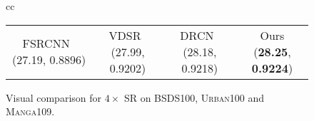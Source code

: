 \documentclass[10pt,twocolumn,letterpaper]{article}
\begin{document}
\begin{figure*}[t]
\begin{tabular}{cc}
\begin{adjustbox}{valign=t}
\begin{tabular}{cccc}
					FSRCNN~\cite{FSRCNN} (27.19, 0.8896) \hspace{-0.25cm} &
					VDSR~\cite{VDSR} (27.99, 0.9202) \hspace{-0.25cm} &
					DRCN~\cite{DRCN} (28.18, 0.9218) \hspace{-0.25cm} &
					Ours (\textbf{28.25}, \textbf{0.9224})
				\end{tabular}
			\end{adjustbox}
		\end{tabular}
		\vspace{-0.2cm}
		\caption{Visual comparison for $4\times$ SR on \textsc{BSDS100}, \textsc{Urban100} and \textsc{Manga109}.}
		\vspace{-0.1cm}
		\label{fig:result-4x}
	\end{figure*}
	
	
	
\end{document}
